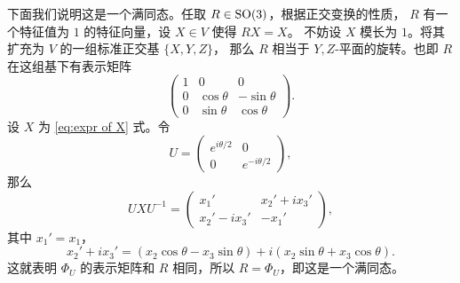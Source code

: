 \begin{example}
  下面我们说明这是一个满同态。任取 $R\in\operatorname{SO}(3)$，根据正交变换的性质，
  $R$ 有一个特征值为 $1$ 的特征向量，设 $X\in V$ 使得 $RX=X$。
  不妨设 $X$ 模长为 $1$。将其扩充为 $V$ 的一组标准正交基 $\{X,Y,Z\}$，
  那么 $R$ 相当于 $Y,Z$-平面的旋转。也即 $R$ 在这组基下有表示矩阵 
  \[
      \begin{pmatrix}
      1 & 0 & 0 \\
      0 &  \cos\theta & -\sin\theta \\
      0 & \sin\theta & \cos\theta 
      \end{pmatrix}.
  \]
  设 $X$ 为 \eqref{eq:expr of X} 式。令 
  \[
      U=\begin{pmatrix}
        e^{i\theta/2} & 0 \\
        0 & e^{-i\theta/2}
      \end{pmatrix},
  \]
  那么
  \[
      UXU^{-1}=\begin{pmatrix}
        x_1' & x_2'+ix_3' \\
        x_2'-ix_3' & -x_1'
      \end{pmatrix},
  \]
  其中 $x_1'=x_1$，
  \[
      x_2'+ix_3'=(x_2\cos\theta-x_3\sin\theta) +i(x_2\sin\theta+x_3\cos\theta).
  \]
  这就表明 $\Phi_U$ 的表示矩阵和 $R$ 相同，所以 $R=\Phi_U$，即这是一个满同态。


\end{example}
